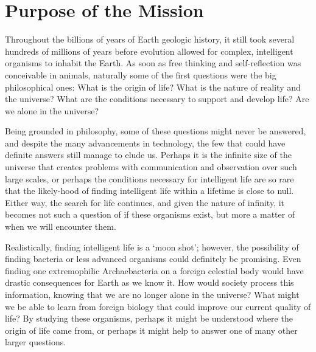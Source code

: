     

\section{Purpose of the Mission}
Throughout the billions of years of Earth geologic history, it still took several hundreds of millions of years before evolution allowed for complex, intelligent organisms to inhabit the Earth. As soon as free thinking and self-reflection was conceivable in animals, naturally some of the first questions were the big philosophical ones: What is the origin of life? What is the nature of reality and the universe? What are the conditions necessary to support and develop life? Are we alone in the universe?

Being grounded in philosophy, some of these questions might never be answered, and despite the many advancements in technology, the few that could have definite answers still manage to elude us. Perhaps it is the infinite size of the universe that creates problems with communication and observation over such large scales, or perhaps the conditions necessary for intelligent life are so rare that the likely-hood of finding intelligent life within a lifetime is close to null. Either way, the search for life continues, and given the nature of infinity, it becomes not such a question of if these organisms exist, but more a matter of when we will encounter them.

Realistically, finding intelligent life is a `moon shot'; however, the possibility of finding bacteria or less advanced organisms could definitely be promising. Even finding one extremophilic Archaebacteria on a foreign celestial body would have drastic consequences for Earth as we know it. How would society process this information, knowing that we are no longer alone in the universe? What might we be able to learn from foreign biology that could improve our current quality of life? By studying these organisms, perhaps it might be understood where the origin of life came from, or perhaps it might help to answer one of many other larger questions.

